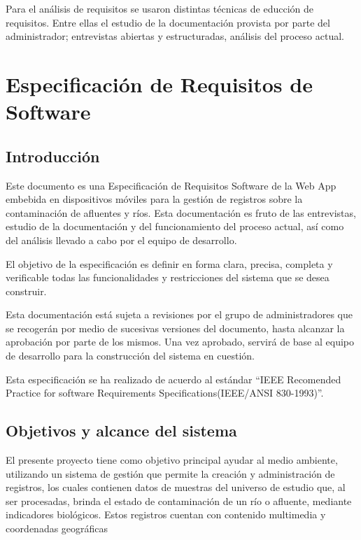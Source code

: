       Para el análisis de requisitos se usaron distintas técnicas de educción de requisitos. Entre ellas el estudio de la documentación provista por parte del administrador; entrevistas abiertas y estructuradas, análisis del proceso actual.

  \section{Especificación de Requisitos de Software}

    \renewcommand{\thesubsection}{\arabic{subsection}}
    \subsection{Introducción}

      Este documento es una Especificación de Requisitos Software de la  Web App embebida en dispositivos móviles para la gestión de registros sobre la contaminación de afluentes y ríos. Esta documentación es fruto de las entrevistas, estudio de la documentación y del funcionamiento del proceso actual, así como del análisis llevado a cabo por el equipo de desarrollo.

      El objetivo de la especificación es definir en forma clara, precisa, completa y verificable todas las funcionalidades y restricciones del sistema que se desea construir.

      Esta documentación está sujeta a revisiones por el grupo de administradores que se recogerán por medio de sucesivas versiones del documento, hasta alcanzar la aprobación por parte de los mismos. Una vez aprobado, servirá de base al equipo de desarrollo para la construcción del sistema en cuestión.

      Esta especificación se ha realizado de acuerdo al estándar “IEEE Recomended Practice for software Requirements Specifications(IEEE/ANSI 830-1993)”.


    \subsection{Objetivos y alcance del sistema}

      El presente proyecto tiene como objetivo principal ayudar al medio ambiente, utilizando un sistema de gestión que permite la creación y administración de registros, los cuales contienen datos de muestras del universo de estudio que, al ser procesadas, brinda el estado de contaminación de un río o afluente, mediante indicadores biológicos.
      Estos registros cuentan con contenido multimedia y coordenadas geográficas

